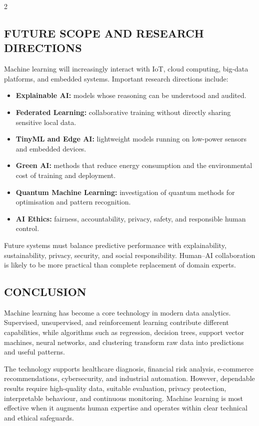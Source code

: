 \begin{multicols}{2}
  \subsection*{\centering\uppercase{Future Scope and Research Directions}}
  Machine learning will increasingly interact with IoT, cloud computing, big-data platforms, and embedded systems. Important research directions include:
  \begin{itemize}\justifying
    \item \textbf{Explainable AI:} models whose reasoning can be understood and audited.
    \item \textbf{Federated Learning:} collaborative training without directly sharing sensitive local data.
    \item \textbf{TinyML and Edge AI:} lightweight models running on low-power sensors and embedded devices.
    \item \textbf{Green AI:} methods that reduce energy consumption and the environmental cost of training and deployment.
    \item \textbf{Quantum Machine Learning:} investigation of quantum methods for optimisation and pattern recognition.
    \item \textbf{AI Ethics:} fairness, accountability, privacy, safety, and responsible human control.
  \end{itemize}
  Future systems must balance predictive performance with explainability, sustainability, privacy, security, and social responsibility. Human--AI collaboration is likely to be more practical than complete replacement of domain experts.

  \subsection*{\centering\uppercase{Conclusion}}
  Machine learning has become a core technology in modern data analytics. Supervised, unsupervised, and reinforcement learning contribute different capabilities, while algorithms such as regression, decision trees, support vector machines, neural networks, and clustering transform raw data into predictions and useful patterns.

  \noindent
  The technology supports healthcare diagnosis, financial risk analysis, e-commerce recommendations, cybersecurity, and industrial automation. However, dependable results require high-quality data, suitable evaluation, privacy protection, interpretable behaviour, and continuous monitoring. Machine learning is most effective when it augments human expertise and operates within clear technical and ethical safeguards.


\end{multicols}
